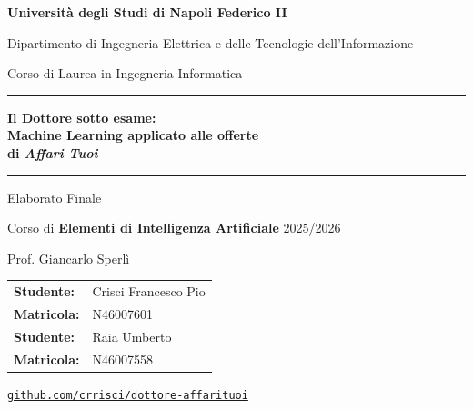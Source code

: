 \documentclass[12pt, a4paper]{article}
\begin{document}

\begin{titlepage}
\centering
\vspace*{1.5cm}

{\Large\textbf{Università degli Studi di Napoli Federico II}}\par
\vspace{0.3cm}
{\large Dipartimento di Ingegneria Elettrica e delle Tecnologie dell'Informazione}\par
\vspace{0.2cm}
{\normalsize Corso di Laurea in Ingegneria Informatica}\par

\vspace{1.5cm}
\noindent\rule{\textwidth}{1.5pt}
\vspace{0.4cm}

{\LARGE\bfseries\color{bluniapoli}
Il Dottore sotto esame:\\ Machine Learning applicato alle offerte\\di \textit{Affari Tuoi}}\par

\vspace{0.4cm}
\noindent\rule{\textwidth}{1.5pt}

\vspace{1.2cm}
{\large Elaborato Finale}\par
\vspace{0.2cm}
{\normalsize Corso di \textbf{Elementi di Intelligenza Artificiale} 2025/2026}\par
\vspace{0.1cm}
{\normalsize Prof. Giancarlo Sperlì}\par

\vfill

\begin{tabular}{ll}
  \textbf{Studente:} &  Crisci Francesco Pio \\
  \textbf{Matricola:} & N46007601 \\
  \textbf{Studente:} & Raia Umberto \\
  \textbf{Matricola:} & N46007558 \\
\end{tabular}

\vspace{1cm}
 
\begin{center}
  {\small\texttt{\href{https://github.com/crrisci/dottore-affarituoi}{github.com/crrisci/dottore-affarituoi}}}
\end{center}

\vspace{1.5cm}
\end{titlepage}
\end{document}

